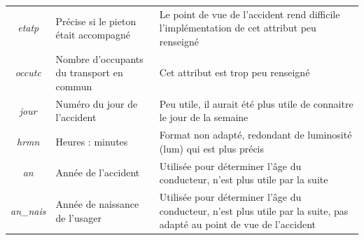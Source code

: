 \documentclass{article}
\begin{document}
\begin{center}
\begin{tabular}{ |c|p{3.5cm}|p{7cm}| }
            \textit{etatp} & Précise si le pieton était accompagné & Le point de vue de l'accident rend difficile l'implémentation de cet attribut peu renseigné\\
            \textit{occutc} & Nombre d'occupants du transport en commun & Cet attribut est trop peu renseigné\\
            \textit{jour} & Numéro du jour de l'accident & Peu utile, il aurait été plus utile de connaitre le jour de la semaine\\
            \textit{hrmn} & Heures : minutes & Format non adapté, redondant de luminosité (lum) qui est plus précis\\
            \textit{an} & Année de l'accident & Utilisée pour déterminer l'âge du conducteur, n'est plus utile par la suite \\
            \textit{an\_nais} & Année de naissance de l'usager & Utilisée pour déterminer l'âge du conducteur, n'est plus utile par la suite, pas adapté au point de vue de l'accident \\
            \hline
        \end{tabular}
    \end{center}
    \newpage
\end{document}
